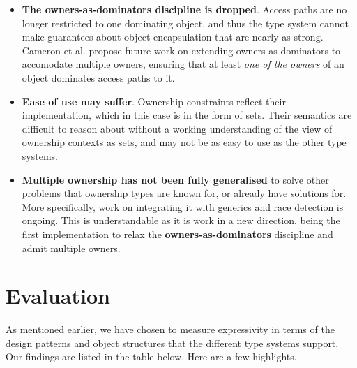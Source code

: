 \documentclass{acm_proc_article-sp}
\begin{document}
\begin{itemize}

	\item \textbf{The owners-as-dominators discipline is dropped}. Access paths
		are no longer restricted to one dominating object, and thus the type
		system cannot make guarantees about object encapsulation that are nearly
		as strong. Cameron et al. propose future work on extending
		owners-as-dominators to accomodate multiple owners, ensuring that at
		least \textit{one of the owners} of an object dominates access paths to
		it.

    \item \textbf{Ease of use may suffer}. Ownership constraints reflect their
        implementation, which in this case is in the form of sets. Their
        semantics are difficult to reason about without a working understanding
        of the view of ownership contexts as sets, and may not be as easy to use
        as the other type systems.

	\item \textbf{Multiple ownership has not been fully generalised} to solve
		other problems that ownership types are known for, or already have
		solutions for. More specifically, work on integrating it with generics
		and race detection is ongoing. This is understandable as it is work in
		a new direction, being the first implementation to relax the
		\textbf{owners-as-dominators} discipline and admit multiple owners.

\end{itemize}

\section{Evaluation}
\label{sec:eval}

As mentioned earlier, we have chosen to measure expressivity in terms of the
design patterns and object structures that the different type systems support.
Our findings are listed in the table below. Here are a few highlights.
\end{document}
